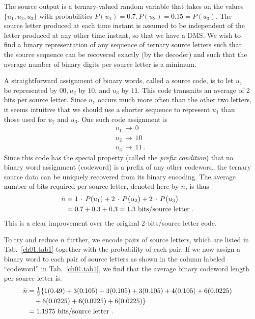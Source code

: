 \begin{example}
\label{ch01.ex11.3.1}
The source output is a ternary-valued random variable that takes on the
values $\{ u_1, u_2, u_3 \}$ with probabilities
$P(u_1) = 0.7, P(u_2) = 0.15 = P(u_3)$. The
source letter produced at each time instant is assumed to be independent of
the letter produced at any other time instant, so that we have a DMS. We
wish to find a binary representation of any sequence of ternary source letters
such that the source sequence can be recovered exactly (by the decoder) and
such that the average number of binary digits per source letter is a minimum.

A straightforward assignment of binary words, called a source code, is to
let $u_1$ be represented by $00, u_2$ by $10$, and $u_3$ by $11$.
This code transmits an
average of 2 bits per source letter. Since $u_1$ occurs much more often
than the
other two letters, it seems intuitive that we should use a shorter sequence to
represent $u_1$ than those used for $u_2$ and $u_3$. One such code assignment is
\begin{align*}
  & u_1 \, \rightarrow \, 0    \\
  & u_2 \, \rightarrow \, 10   \\
  & u_3 \, \rightarrow \, 11~.
\end{align*}
Since this code has the special property (called the \textit{prefix condition})
that no
binary word assignment (codeword) is a prefix of any other codeword, the
ternary source data can be uniquely recovered from its binary encoding. The
average number of bits required per source letter, denoted here by $\bar{n}$,
is thus
\begin{align}
  \bar{n} & = 1 \, \cdot \, P(u_1) +
  2 \, \cdot \, P \big(u_2\big) + 2 \,\cdot\, P\big(u_3\big)
\notag\\
 & = 0.7 + 0.3 + 0.3 = 1.3 \textrm{ bits/source letter}~.
\label{ch01.eq11.3.1}
\end{align}
This is a clear improvement over the original 2-bits/source letter code.

To try and reduce $\bar{n}$ further, we encode pairs of source letters,
which are
listed in Tab.~\ref{ch01.tab1} together with the probability of each pair.
If we now
assign a binary word to each pair of source letters as shown in the column
labeled ``codeword'' in Tab.~\ref{ch01.tab1}, we find that the average
binary codeword
length  per source  letter is.
\begin{align}
 \bar{n} & = \tfrac{1}{2} \{ 1(0.49)  + 3(0.105) + 3(0.105) + 3(0.105) +
 4(0.105) + 6(0.0225)
 \notag\\
 & \quad {} + 6(0.0225) + 6(0.0225) + 6(0.0225) \}
 \notag\\
 & = 1.1975 \textrm{ bits/source letter}~.
\label{ch01.eq11.3.2}
\end{align}


\end{example}
